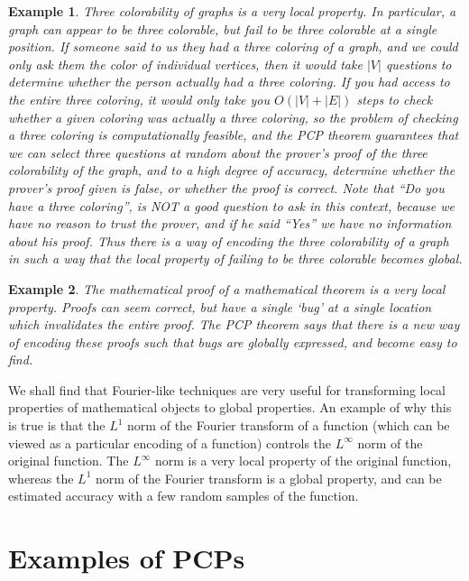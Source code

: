 \documentclass{article}
\theoremstyle{plain}
\newtheorem*{example}{Example}
\theoremstyle{definition}
\begin{document}
\begin{example}
    Three colorability of graphs is a very local property. In particular, a graph can appear to be three colorable, but fail to be three colorable at a single position. If someone said to us they had a three coloring of a graph, and we could only ask them the color of individual vertices, then it would take $|V|$ questions to determine whether the person actually had a three coloring. If you had access to the entire three coloring, it would only take you $O(|V| + |E|)$ steps to check whether a given coloring was actually a three coloring, so the problem of checking a three coloring is computationally feasible, and the PCP theorem guarantees that we can select three questions at random about the prover's proof of the three colorability of the graph, and to a high degree of accuracy, determine whether the prover's proof given is false, or whether the proof is correct. Note that ``Do you have a three coloring'', is NOT a good question to ask in this context, because we have no reason to trust the prover, and if he said ``Yes'' we have no information about his proof. Thus there is a way of encoding the three colorability of a graph in such a way that the local property of failing to be three colorable becomes global.
\end{example}

\begin{example}
    The mathematical proof of a mathematical theorem is a {\it very} local property. Proofs can seem correct, but have a single `bug' at a single location which invalidates the entire proof. The PCP theorem says that there is a new way of encoding these proofs such that bugs are globally expressed, and become easy to find.
\end{example}

We shall find that Fourier-like techniques are very useful for transforming local properties of mathematical objects to global properties. An example of why this is true is that the $L^1$ norm of the Fourier transform of a function (which can be viewed as a particular encoding of a function) controls the $L^\infty$ norm of the original function. The $L^\infty$ norm is a very local property of the original function, whereas the $L^1$ norm of the Fourier transform is a global property, and can be estimated accuracy with a few random samples of the function.

\section{Examples of PCPs}
\end{document}
